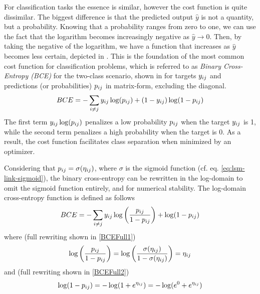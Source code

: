         For classification tasks the essence is similar, however the cost function is quite dissimilar. The biggest difference is that the predicted output $\hat{y}$ is not a quantity, but a probability. Knowing that a probability ranges from zero to one, we can use the fact that the logarithm becomes increasingly negative as $\hat{y}\rightarrow0$. Then, by taking the negative of the logarithm, we have a function that increases as $\hat{y}$ becomes less certain, depicted in .
        This is the foundation of the most common cost function for classification problems, which is referred to as \emph{Binary Cross-Entropy (BCE)} for the two-class scenario, shown in  for targets $\sub(y)$ and predictions (or probabilities) $\sub(p)$ in matrix-form, excluding the diagonal.
        \begin{equation}\label{eq:mopt-bceloss}
            BCE = -\sum_{i\neq j} \sub(y)\log(\sub(p))+(1-\sub(y))\log(1-\sub(p))
        \end{equation}
        The first term $\sub(y)\log(\sub(p))$ penalizes a low probability $\sub(p)$ when the target $\sub(y)$ is 1, while the second term penalizes a high probability when the target is 0. As a result, the cost function facilitates class separation when minimized by an optimizer.
        
        Considering that $\sub(p)=\sigma(\sub(\eta))$, where $\sigma$ is the sigmoid function (cf. eq. \ref{eq:lsm-link-sigmoid}), the binary cross-entropy can be rewritten in the log-domain to omit the sigmoid function entirely, and for numerical stability. The log-domain cross-entropy function is defined as follows
        \begin{equation}\label{eq:bce-log-domain}
            BCE = -\sum_{i\neq j} \sub(y)\log\left(\frac{\sub(p)}{1-\sub(p)}\right) + \log(1-\sub(p))
        \end{equation}
        where (full rewriting shown in \cref{BCEFull1})
        \begin{equation}\label{eq:bce-rewrite-first}
            \log\left(\frac{\sub(p)}{1-\sub(p)}\right) =
            \log\left(\frac{\sigma(\sub(\eta))}{1-\sigma(\sub(\eta))}\right) = \sub(\eta)
        \end{equation}
        and (full rewriting shown in \cref{BCEFull2})
        \begin{equation}\label{eq:bce-rewrite-second}
            \log(1-\sub(p))=-\log(1+e^{\sub(\eta)})=-\log(e^0+e^{\sub(\eta)})
        \end{equation}
        
